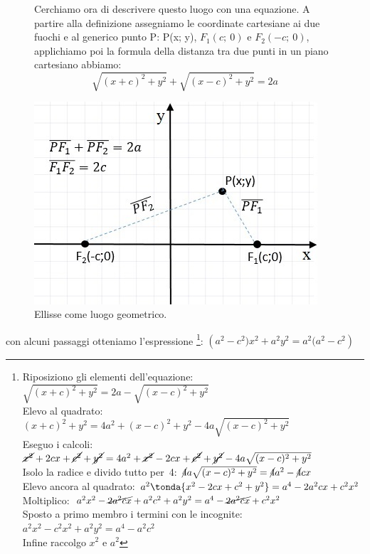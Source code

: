 \begin{figure}[h]
\noindent\begin{minipage}{.50\textwidth}
Cerchiamo ora di descrivere questo luogo con una equazione. A partire alla 
definizione assegniamo le coordinate cartesiane ai due fuochi e al generico 
punto P: P(x; y), $ F_{1}(c;~0)$ e $ F_{2} (-c;~0)$, applichiamo poi la 
formula della distanza tra due punti in un piano cartesiano abbiamo:
\[\sqrt{(x+c)^{2}+y^{2}}+\sqrt{(x-c)^{2}+y^{2}}=2a\]
\end{minipage}
\hfill
\begin{minipage}{.48\textwidth}
\begin{center}
  \includegraphics[width=.9\textwidth]{img/PF1F2.jpg}
  \caption{Ellisse come luogo geometrico.}
\end{center}
\end{minipage} 
\end{figure}

con alcuni passaggi otteniamo l'espressione
\footnote{
Riposiziono gli elementi dell'equazione:  \quad
\(\sqrt{(x+c)^2+y^2} = 2a - \sqrt{(x-c)^2+y^2}\)\\
Elevo al quadrato: \quad
\((x+c)^2+y^2 = 4a^2+(x-c)^2+y^2 -4a \sqrt{(x-c)^2+y^2}\)\\
Eseguo i calcoli: \quad
\(\cancel{x^2}+2cx+\cancel{c^2}+\cancel{y^2} = 
  4a^2+\cancel{x^2}-2cx+\cancel{c^2}+\cancel{y^2} 
  -4a \sqrt{(x-c)^2+y^2}\)\\
Isolo la radice e divido tutto per~4: \quad
\(\cancel{4}a \sqrt{(x-c)^2+y^2} = \cancel{4}a^2-\cancel{4}cx\)\\
Elevo ancora al quadrato:  \quad
\(a^2 \tonda{x^2-2cx+c^2+y^2} = a^4-2a^2cx+c^2x^2\)\\
Moltiplico: \quad
\(a^2x^2-\cancel{2a^2cx}+a^2c^2+a^2y^2 = a^4-\cancel{2a^2cx}+c^2x^2\)\\
Sposto a primo membro i termini con le incognite: \quad
\(a^2x^2-c^2x^2+a^2y^2 = a^4-a^2c^2\)\\
Infine raccolgo \(x^2\) e \(a^2\)
}: \quad
$\left( a^{2}-c^{2})x^{2}+a^{2}y^{2}=a^{2}(a^{2}-c^{2}\right)$

